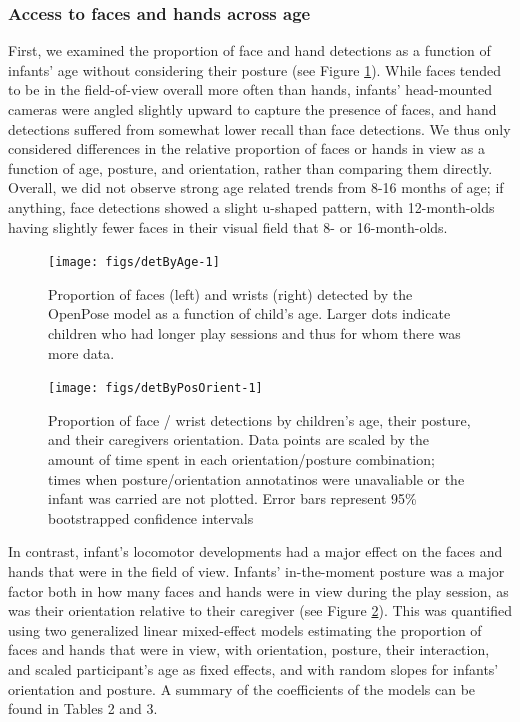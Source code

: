 \documentclass[english,man]{apa6}
\begin{document}
\subsubsection{Access to faces and hands across
age}\label{access-to-faces-and-hands-across-age}

First, we examined the proportion of face and hand detections as a
function of infants' age without considering their posture (see Figure
\ref{fig:detByAge}). While faces tended to be in the field-of-view
overall more often than hands, infants' head-mounted cameras were angled
slightly upward to capture the presence of faces, and hand detections
suffered from somewhat lower recall than face detections. We thus only
considered differences in the relative proportion of faces or hands in
view as a function of age, posture, and orientation, rather than
comparing them directly. Overall, we did not observe strong age related
trends from 8-16 months of age; if anything, face detections showed a
slight u-shaped pattern, with 12-month-olds having slightly fewer faces
in their visual field that 8- or 16-month-olds.

\begin{figure}[H]
\texttt{[image: figs/detByAge-1]} \caption{Proportion of faces (left) and wrists (right) detected by the OpenPose model as a function of child's age. Larger dots indicate children who had longer play sessions and thus for whom there was more data.}\label{fig:detByAge}
\end{figure}

\begin{figure}[H]

{\centering \texttt{[image: figs/detByPosOrient-1]} 

}

\caption{Proportion of face / wrist detections by children's age, their posture, and their caregivers orientation. Data points are scaled by the amount of time spent in each orientation/posture combination; times when posture/orientation annotatinos were unavaliable or the infant was carried are not plotted. Error bars represent 95\% bootstrapped confidence intervals}\label{fig:detByPosOrient}
\end{figure}

In contrast, infant's locomotor developments had a major effect on the
faces and hands that were in the field of view. Infants' in-the-moment
posture was a major factor both in how many faces and hands were in view
during the play session, as was their orientation relative to their
caregiver (see Figure \ref{fig:detByPosOrient}). This was quantified
using two generalized linear mixed-effect models estimating the
proportion of faces and hands that were in view, with orientation,
posture, their interaction, and scaled participant's age as fixed
effects, and with random slopes for infants' orientation and posture. A
summary of the coefficients of the models can be found in Tables 2 and
3.
\end{document}
